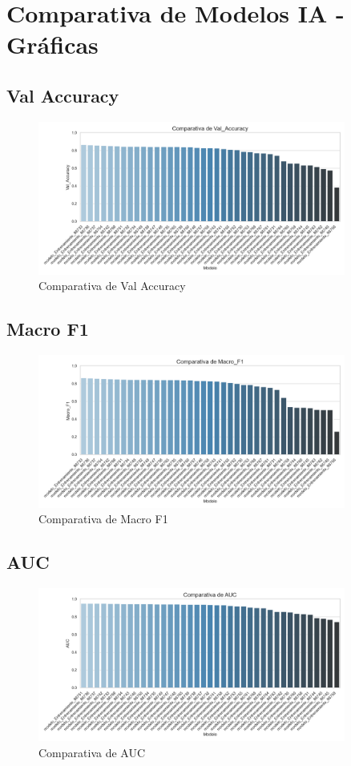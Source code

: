 \section{Comparativa de Modelos IA - Gráficas}
\subsection{Val Accuracy}
\begin{figure}[H]
\centering
\includegraphics[width=0.9\textwidth]{Graficas/Val_Accuracy_barplot.png}
\caption{Comparativa de Val Accuracy}
\end{figure}

\subsection{Macro F1}
\begin{figure}[H]
\centering
\includegraphics[width=0.9\textwidth]{Graficas/Macro_F1_barplot.png}
\caption{Comparativa de Macro F1}
\end{figure}

\subsection{AUC}
\begin{figure}[H]
\centering
\includegraphics[width=0.9\textwidth]{Graficas/AUC_barplot.png}
\caption{Comparativa de AUC}
\end{figure}

